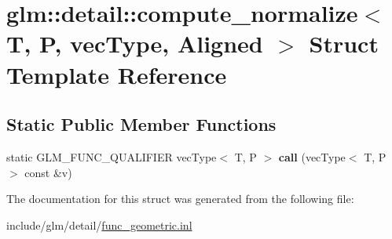 \hypertarget{structglm_1_1detail_1_1compute__normalize}{}\section{glm\+:\+:detail\+:\+:compute\+\_\+normalize$<$ T, P, vec\+Type, Aligned $>$ Struct Template Reference}
\label{structglm_1_1detail_1_1compute__normalize}
\subsection*{Static Public Member Functions}
\begin{DoxyCompactItemize}
\item 
\mbox{\label{structglm_1_1detail_1_1compute__normalize_a3c50cc24c57b7cd61d1fb90352699127}} 
static G\+L\+M\+\_\+\+F\+U\+N\+C\+\_\+\+Q\+U\+A\+L\+I\+F\+I\+ER vec\+Type$<$ T, P $>$ {\bfseries call} (vec\+Type$<$ T, P $>$ const \&v)
\end{DoxyCompactItemize}


The documentation for this struct was generated from the following file\+:\begin{DoxyCompactItemize}
\item 
include/glm/detail/\hyperlink{func__geometric_8inl}{func\+\_\+geometric.\+inl}\end{DoxyCompactItemize}
